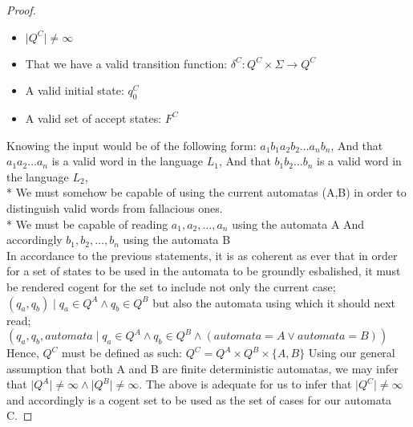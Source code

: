 \documentclass{article}
\begin{document}
\begin{proof}
\begin{itemize}
\item $\lvert Q^{C} \rvert \ne \infty$ \newline
\item That we have a valid transition function: $\delta^{C} : Q^{C} \times \Sigma \rightarrow Q^{C}$ \newline
\item A valid initial state: $q_0^{C}$ \newline
\item A valid set of accept states: $F^{C}$ \newline
\end{itemize}
Knowing the input would be of the following form: $a_1b_1a_2b_2\ldots a_nb_n$, \newline
And that $a_1a_2\ldots a_n$ is a valid word in the language $L_1$, \newline
And that $b_1b_2\ldots b_n$ is a valid word in the language $L_2$, \newline
\\*
We must somehow be capable of using the current automatas (A,B) in order to distinguish valid words from fallacious ones. \newline
\\*
We must be capable of reading $a_1, a_2, \ldots, a_n$ using the automata A\newline
And accordingly $b_1, b_2, \ldots, b_n$ using the automata B \newline
\\
In accordance to the previous statements, it is as coherent as ever that in order for a set of states to be used in the automata to be groundly esbalished, it must be rendered cogent for the set to include not only the current case; $(q_a, q_b) \mid q_a \in Q^{A} \wedge q_b \in Q^{B}$ but also the automata using which it should next read; $(q_a, q_b, automata \mid q_a \in Q^{A} \wedge q_b \in Q^{B} \wedge (automata = A \vee automata = B))$ \newline
\\
Hence, $Q^{C}$ must be defined as such: $Q^{C} = Q^{A} \times Q^{B} \times \{A,B\}$ \newline
Using our general assumption that both A and B are finite deterministic automatas, we may infer that $\lvert Q^{A} \rvert \ne \infty \wedge \lvert Q^{B} \rvert \ne \infty$. \newline
The above is adequate for us to infer that $\lvert Q^{C} \rvert \ne \infty$ and accordingly is a cogent set to be used as the set of cases for our automata C. \newline

\end{proof}
\end{document}
